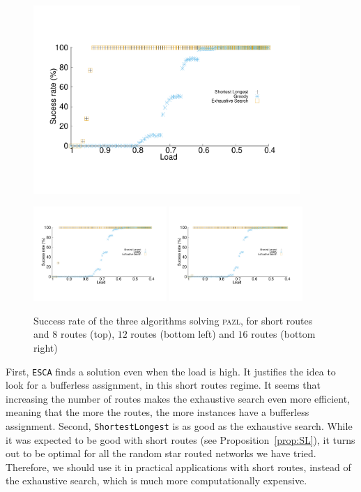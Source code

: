 \documentclass[a4paper,10pt]{journal}
\newcommand\shortestlongest{\texttt{ShortestLongest}\xspace}
\newcommand\ESCA{\texttt{ESCA}\xspace}
\newcommand\pazl{\textsc{pazl}\xspace}
\begin{document}
\begin{figure}[h]
\begin{center}
\includegraphics[width=0.9\textwidth]{pazlshort8.pdf}
\vspace{1cm}

\includegraphics[width=0.45\textwidth]{pazlshort12.pdf}
\includegraphics[width=0.45\textwidth]{pazlshort16.pdf}
\end{center}
\caption{Success rate of the three algorithms solving \pazl, for short routes and $8$ routes (top), $12$ routes (bottom left) and $16$ routes (bottom right)}\label{fig:short}
\end{figure}

First, \ESCA finds a solution even when the load is high. It justifies the idea to look for a bufferless assignment, in this short routes regime.
It seems that increasing the number of routes makes the exhaustive search even more efficient, meaning that the more the routes, the more instances have a bufferless assignment.
Second, \shortestlongest is as good as the exhaustive search. While it was expected to be good with short routes (see Proposition~\ref{prop:SL}), it turns out to be optimal for all the random star routed networks we have tried. Therefore, we should use it in practical applications with short routes, instead of the exhaustive search, which is much more computationally expensive.
\end{document}
